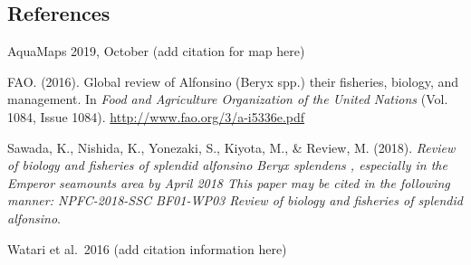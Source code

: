 \documentclass[
]{article}
\begin{document}
\hypertarget{references}{%
\subsection{References}\label{references}}

AquaMaps 2019, October (add citation for map here)

FAO. (2016). Global review of Alfonsino (Beryx spp.) their fisheries,
biology, and management. In \emph{Food and Agriculture Organization of
the United Nations} (Vol. 1084, Issue 1084).
\url{http://www.fao.org/3/a-i5336e.pdf}

Sawada, K., Nishida, K., Yonezaki, S., Kiyota, M., \& Review, M. (2018).
\emph{Review of biology and fisheries of splendid alfonsino Beryx
splendens , especially in the Emperor seamounts area by April 2018 This
paper may be cited in the following manner: NPFC-2018-SSC BF01-WP03
Review of biology and fisheries of splendid alfonsino}.

Watari et al.~2016 (add citation information here)
\end{document}
